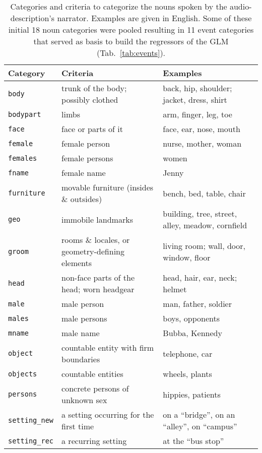 \documentclass[english]{article}
\begin{document}
\begin{table*}[tbp]
    \caption{Categories and criteria to categorize the nouns spoken by
        the audio-description's narrator.
        Examples are given in English.
        Some of these initial 18 noun categories were pooled resulting in 11
        event categories that served as basis to build the regressors of the
        GLM
        (Tab.~\ref{tab:events}).
}
\label{tab:descr-nouns-rules}
\begin{tabular}{lp{61mm}p{61mm}}
\toprule
\textbf{Category} & \textbf{Criteria} & \textbf{Examples} \\
\midrule
\texttt{body} & trunk of the body; possibly clothed & back, hip, shoulder; jacket, dress, shirt
\tabularnewline
\texttt{bodypart} & limbs & arm, finger, leg, toe
\tabularnewline
\texttt{face} & face or parts of it & face, ear, nose, mouth
\tabularnewline
\texttt{female} & female person & nurse, mother, woman
\tabularnewline
\texttt{females} & female persons & women
\tabularnewline
\texttt{fname} & female name & Jenny
\tabularnewline
\texttt{furniture} & movable furniture (insides \& outsides) & bench, bed, table, chair
\tabularnewline
\texttt{geo} & immobile landmarks & building, tree, street, alley, meadow, cornfield
\tabularnewline
\texttt{groom} & rooms \& locales, or geometry-defining elements & living room; wall, door, window, floor
\tabularnewline
\texttt{head} & non-face parts of the head; worn headgear & head, hair, ear, neck;
helmet
\tabularnewline
\texttt{male} & male person & man, father, soldier
\tabularnewline
\texttt{males} & male persons & boys, opponents
\tabularnewline
\texttt{mname} & male name & Bubba, Kennedy
\tabularnewline
\texttt{object} & countable entity with firm boundaries & telephone, car
\tabularnewline
\texttt{objects} & countable entities & wheels, plants
\tabularnewline
\texttt{persons} & concrete persons of unknown sex & hippies, patients
\tabularnewline
\texttt{setting\_new} & a setting occurring for the first time & on a ``bridge'', on an ``alley'', on ``campus''
\tabularnewline
\texttt{setting\_rec} & a recurring setting & at the ``bus stop'' \tabularnewline
\bottomrule
\end{tabular}
\end{table*}
\end{document}
